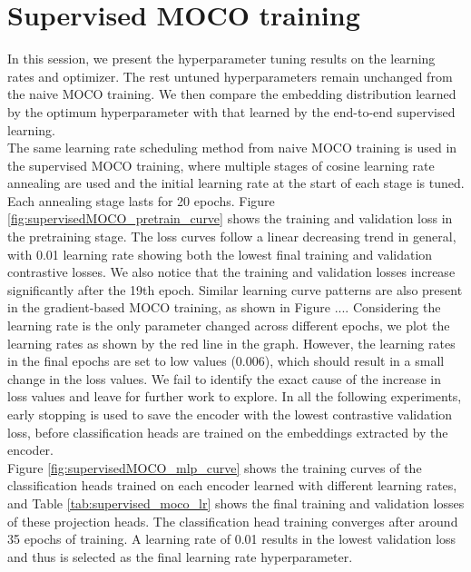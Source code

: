 \documentclass[12pt,twoside]{report}
\begin{document}
\section{Supervised MOCO training} \label{sec:supervisedMOCO_eval}
In this session, we present the hyperparameter tuning results on the learning rates and optimizer. The rest untuned hyperparameters remain unchanged from the naive MOCO training. We then compare the embedding distribution learned by the optimum hyperparameter with that learned by the end-to-end supervised learning.\\

The same learning rate scheduling method from naive MOCO training is used in the supervised MOCO training, where multiple stages of cosine learning rate annealing are used and the initial learning rate at the start of each stage is tuned. Each annealing stage lasts for 20 epochs. Figure \ref{fig:supervisedMOCO_pretrain_curve} shows the training and validation loss in the pretraining stage. The loss curves follow a linear decreasing trend in general, with 0.01 learning rate showing both the lowest final training and validation contrastive losses. We also notice that the training and validation losses increase significantly after the 19th epoch. Similar learning curve patterns are also present in the gradient-based MOCO training, as shown in Figure .... Considering the learning rate is the only parameter changed across different epochs, we plot the learning rates as shown by the red line in the graph. However, the learning rates in the final epochs are set to low values (0.006), which should result in a small change in the loss values. We fail to identify the exact cause of the increase in loss values and leave for further work to explore. 
In all the following experiments, early stopping is used to save the encoder with the lowest contrastive validation loss, before classification heads are trained on the embeddings extracted by the encoder. \\

Figure \ref{fig:supervisedMOCO_mlp_curve} shows the training curves of the classification heads trained on each encoder learned with different learning rates, and Table \ref{tab:supervised_moco_lr} shows the final training and validation losses of these projection heads. The classification head training converges after around 35 epochs of training. A learning rate of 0.01 results in the lowest validation loss and thus is selected as the final learning rate hyperparameter.\\
\end{document}
